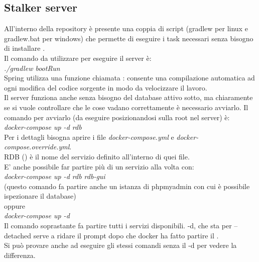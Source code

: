 \documentclass[../manuale-sviluppatore.tex]{subfiles}
\begin{document}
\subsection{Stalker server}

All'interno della repository è presente una coppia di script (gradlew per linux e gradlew.bat per windows) che permette di eseguire i task necessari 
senza bisogno di installare .\\
Il comando da utilizzare per eseguire il server è:\\

\emph{./gradlew bootRun}\\

Spring utilizza una funzione chiamata : consente una compilazione automatica ad ogni modifica del codice sorgente in modo da velocizzare il lavoro.\\
Il server funziona anche senza bisogno del database attivo sotto, ma chiaramente se si vuole controllare che le cose vadano correttamente è necessario avviarlo.
Il comando per avviarlo (da eseguire posizionandosi sulla root nel server) è:\\

\emph{docker-compose up -d rdb}\\

Per i dettagli bisogna aprire i file \emph{docker-compose.yml} e \emph{docker-compose.override.yml}.\\
RDB () è il nome del servizio definito all'interno di quei file. \\
E' anche possibile far partire più di un servizio alla volta con:\\

\emph{docker-compose up -d rdb rdb-gui}\\

(questo comando fa partire anche un istanza di phpmyadmin con cui è possibile ispezionare il database)\\

oppure\\

\emph{docker-compose up -d}\\

Il comando soprastante fa partire tutti i servizi disponibili. -d, che sta per --detached serve a ridare il prompt dopo che docker ha fatto partire il .\\ 
Si può provare anche ad eseguire gli stessi comandi senza il -d per vedere la differenza.\\
\end{document}
